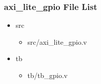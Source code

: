 \subsubsection{axi\_lite\_gpio File List}
\begin{itemize}
\item src
	\begin{itemize}
	\item src/axi\_lite\_gpio.v
	\end{itemize}
\item tb
	\begin{itemize}
	\item tb/tb\_gpio.v
	\end{itemize}
\end{itemize}
